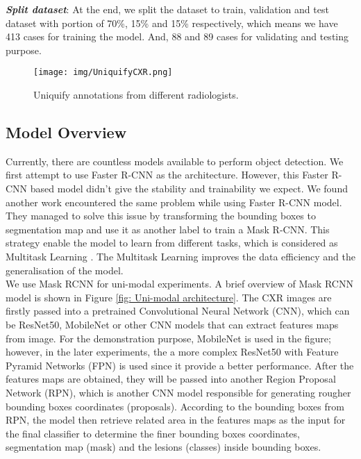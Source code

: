 \documentclass[journal,twoside,web, 11pt]{ieeecolor}
\begin{document}
\textbf{\textit{Split dataset}}: At the end, we split the dataset to train, validation and test dataset with portion of 70\%, 15\% and 15\% respectively, which means we have 413 cases for training the model. And, 88 and 89 cases for validating and testing purpose.\\

\begin{figure*}[!h]
    \centering
    \texttt{[image: img/UniquifyCXR.png]}
    \caption{Uniquify annotations from different radiologists.}
    \label{fig: UniquifyCXR}
\end{figure*}

\subsection{Model Overview}

Currently, there are countless models available to perform object detection. We first attempt to use Faster R-CNN \cite{Shaoqing2015FasterRCNN} as the architecture. However, this Faster R-CNN based model didn't give the stability and trainability we expect. We found another work \cite{Amit2019pneumonia} encountered the same problem while using Faster R-CNN model. They managed to solve this issue by transforming the bounding boxes to segmentation map and use it as another label to train a Mask R-CNN\cite{Kaiming2017MaskRCNN}. This strategy enable the model to learn from different tasks, which is considered as Multitask Learning \cite{Michael2020MultitaskLearning}. The Multitask Learning improves the data efficiency and the generalisation of the model. \\

We use Mask RCNN for uni-modal experiments. A brief overview of Mask RCNN model is shown in Figure \ref{fig: Uni-modal architecture}. The CXR images are firstly passed into a pretrained Convolutional Neural Network (CNN), which can be ResNet50\cite{Kaiming2015ResNet}, MobileNet\cite{Andrew2017MobileNets} or other CNN models that can extract features maps from image. For the demonstration purpose, MobileNet is used in the figure; however, in the later experiments, the a more complex ResNet50 with Feature Pyramid Networks (FPN) \cite{Tsung2016FPN} is used since it provide a better performance. After the features maps are obtained, they will be passed into another Region Proposal Network (RPN), which is another CNN model responsible for generating rougher bounding boxes coordinates (proposals). According to the bounding boxes from RPN, the model then retrieve related area in the features maps as the input for the final classifier to determine the finer bounding boxes coordinates, segmentation map (mask) and the lesions (classes) inside bounding boxes.\\
\end{document}
